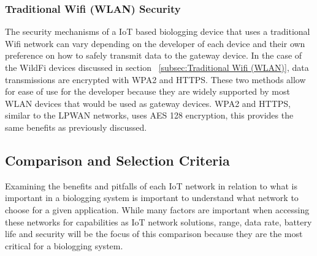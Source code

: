 \documentclass[sigplan,screen,nonacm]{acmart}
\begin{document}
\subsubsection{Traditional Wifi (WLAN) Security}
\label{subsec:Traditional Wifi (WLAN) Security}

The security mechanisms of a IoT based biologging device that uses a traditional Wifi network can vary 
depending on the developer of each device and their own preference on how to safely transmit data to the gateway 
device. In the case of the WildFi devices discussed in section ~\ref{subsec:Traditional Wifi (WLAN)}, data 
transmissions are encrypted with WPA2 and HTTPS\cite{wild2023internet}. These two methods allow for ease of 
use for the developer because they are widely supported by most WLAN devices that would be used as gateway 
devices. WPA2 and HTTPS, similar to the LPWAN networks, uses AES 128 encryption, this provides the same 
benefits as previously discussed\cite{WPA2Moissinac}. 

\subsection{Comparison and Selection Criteria}
\label{subsec:Protocol Comparison and Selection Criteria}

Examining the benefits and pitfalls of each IoT network in relation to what is important in a biologging 
system is important to understand what network to choose for a given application. While many factors are 
important when accessing these networks for capabilities as IoT network solutions, range, data rate, battery 
life and security will be the focus of this comparison because they are the most critical for a biologging 
system.
\end{document}
